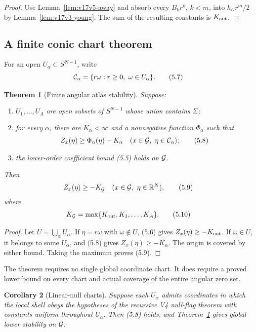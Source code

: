 \documentclass[11pt]{article}
\newtheorem{theorem}{Theorem}[section]
\newtheorem{corollary}[theorem]{Corollary}
\theoremstyle{remark}
\begin{document}
\begin{proof}
Use Lemma~\ref{lem:v17v5-away} and absorb every
\(B_kr^k\), \(k<m\), into \(h_Ur^m/2\) by
Lemma~\ref{lem:v17v3-young}.  The sum of the resulting constants is
\(K_{\rm out}\).
\end{proof}

\subsection{A finite conic chart theorem}

For an open \(U_\alpha\subset S^{N-1}\), write
\[
 {\cal C}_\alpha=
 \{r\omega:r\geq0,\ \omega\in U_\alpha\}.           \tag{5.7}
\]

\begin{theorem}[Finite angular atlas stability]
\label{thm:v17v5-atlas}
Suppose:
\begin{enumerate}
\item \(U_1,\ldots,U_A\) are open subsets of \(S^{N-1}\) whose union
      contains \(\Sigma\);
\item for every \(\alpha\), there are \(K_\alpha<\infty\) and a
      nonnegative function \(\Phi_\alpha\) such that
      \[
      Z_x(\eta)\geq\Phi_\alpha(\eta)-K_\alpha
      \quad(x\in{\cal G},\ \eta\in{\cal C}_\alpha); \tag{5.8}
      \]
\item the lower-order coefficient bound (5.5) holds on
      \({\cal G}\).
\end{enumerate}
Then
\[
 Z_x(\eta)\geq-K_{\cal G}
 \quad(x\in{\cal G},\ \eta\in\mathbb R^N),          \tag{5.9}
\]
where
\[
 K_{\cal G}=
 \max\{K_{\rm out},K_1,\ldots,K_A\}.                \tag{5.10}
\]
\end{theorem}

\begin{proof}
Let \(U=\bigcup_\alpha U_\alpha\).  If
\(\eta=r\omega\) with \(\omega\notin U\), (5.6) gives
\(Z_x(\eta)\geq-K_{\rm out}\).  If \(\omega\in U\), it belongs to
some \(U_\alpha\), and (5.8) gives
\(Z_x(\eta)\geq-K_\alpha\).  The origin is covered by either bound.
Taking the maximum proves (5.9).
\end{proof}

The theorem requires no single global coordinate chart.  It does
require a proved lower bound on every chart and actual coverage of
the entire angular zero set.

\begin{corollary}[Linear-null charts]
\label{cor:v17v5-linear-charts}
Suppose each \(U_\alpha\) admits coordinates in which the local shell
obeys the hypotheses of the recursive V4 null-flag theorem with
constants uniform throughout \(U_\alpha\).  Then (5.8) holds, and
Theorem~\ref{thm:v17v5-atlas} gives global lower stability on
\({\cal G}\).
\end{corollary}
\end{document}
